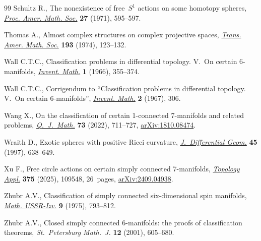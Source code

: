 \documentclass[pdftex]{sigma}
\numberwithin{equation}{section}
\theoremstyle{definition}
\numberwithin{table}{section}
\begin{document}
\begin{thebibliography}{99}
Schultz R., The nonexistence of free~{$S^{1}$} actions on some homotopy
  spheres, \href{https://doi.org/10.2307/2036505}{\textit{Proc. Amer. Math.
  Soc.}} \textbf{27} (1971), 595--597.

Thomas A., Almost complex structures on complex projective spaces,
  \href{https://doi.org/10.2307/1996904}{\textit{Trans. Amer. Math. Soc.}}
  \textbf{193} (1974), 123--132.

Wall C.T.C., Classification problems in differential topology. {V}.~{O}n
  certain {$6$}-manifolds,
  \href{https://doi.org/10.1007/BF01389738}{\textit{Invent. Math.}} \textbf{1}
  (1966), 355--374.

Wall C.T.C., Corrigendum to ``Classification problems in differential topology.
  {V}.~{O}n certain {$6$}-manifolds'',
  \href{https://doi.org/10.1007/BF01425407}{\textit{Invent. Math.}} \textbf{2}
  (1967), 306.

Wang X., On the classification of certain 1-connected 7-manifolds and related
  problems, \href{https://doi.org/10.1093/qmath/haab053}{\textit{Q.~J.~Math.}}
  \textbf{73} (2022), 711--727,
  \href{https://arxiv.org/abs/1810.08474}{arXiv:1810.08474}.

Wraith D., Exotic spheres with positive {R}icci curvature,
  \href{https://doi.org/10.4310/jdg/1214459846}{\textit{J.~Differential Geom.}}
  \textbf{45} (1997), 638--649.

Xu F., Free circle actions on certain simply connected 7-manifolds,
  \href{https://doi.org/10.1016/j.topol.2025.109548}{\textit{Topology Appl.}}
  \textbf{375} (2025), 109548, 26~pages,
  \href{https://arxiv.org/abs/2409.04938}{arXiv:2409.04938}.

Zhubr A.V., Classification of simply connected six-dimensional spin manifolds,
  \href{https://doi.org/10.1070/IM1975v009n04ABEH001498}{\textit{Math.
  USSR-Izv.}} \textbf{9} (1975), 793--812.

Zhubr A.V., Closed simply connected 6-manifolds: the proofs of classification
  theorems, \textit{St.~Petersburg Math.~J.} \textbf{12} (2001), 605--680.

\end{thebibliography}\LastPageEnding
\end{document}
